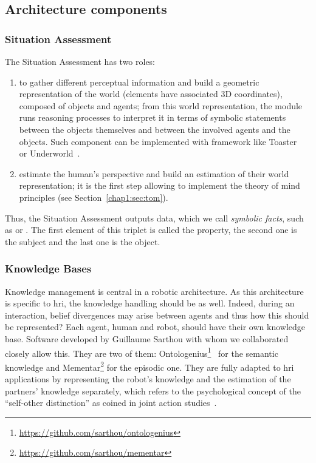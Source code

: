 \documentclass[a4paper,11pt,twoside]{StyleThese}
\begin{document}
\subsection{Architecture components}

\subsubsection{Situation Assessment}\label{chap3:subsubsec:sa}
The Situation Assessment has two roles:
\begin{enumerate}
	\item  to gather different perceptual information and build a geometric representation of the world (\ie elements have associated 3D coordinates), composed of objects and agents; from this world representation, the module runs reasoning processes to interpret it in terms of symbolic statements between the objects themselves and between the involved agents and the objects. Such component can be implemented with framework like Toaster~\cite{milliez_2014_framework} or Underworld~\cite{lemaignan_2018_underworlds}.
	\item estimate the human's perspective and build an estimation of their world representation; it is the first step allowing to implement the theory of mind principles (see Section~\ref{chap1:sec:tom}).
\end{enumerate}

Thus, the Situation Assessment outputs data, which we call \textit{symbolic facts}, such as  or . The first element of this triplet is called the property, the second one is the subject and the last one is the object.

\subsubsection{Knowledge Bases}\label{chap3:subsubsec:kb}

Knowledge management is central in a robotic architecture. As this architecture is specific to \acrshort{hri}, the knowledge handling should be as well. Indeed, during an interaction, belief divergences may arise between agents and thus how this should be represented? Each agent, human and robot, should have their own knowledge base. Software developed by Guillaume Sarthou with whom we collaborated closely allow this. They are two of them: Ontologenius\footnote{\url{https://github.com/sarthou/ontologenius}}~\cite{sarthou_2019_ontologenius} for the semantic knowledge and Mementar\footnote{\url{https://github.com/sarthou/mementar}} for the episodic one. They are fully adapted to \acrshort{hri} applications by representing the robot's knowledge and the estimation of the partners' knowledge separately, which refers to the psychological concept of the ``self-other distinction'' as coined in joint action studies~\cite{pacherie_2012_agency}.  
\end{document}
